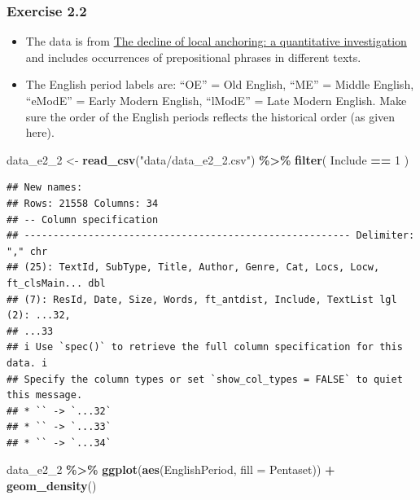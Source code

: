 \documentclass[
]{article}
\newenvironment{Shaded}{\begin{snugshade}}{\end{snugshade}}
\newcommand{\AttributeTok}[1]{\textcolor[rgb]{0.13,0.29,0.53}{#1}}
\newcommand{\DecValTok}[1]{\textcolor[rgb]{0.00,0.00,0.81}{#1}}
\newcommand{\FunctionTok}[1]{\textcolor[rgb]{0.13,0.29,0.53}{\textbf{#1}}}
\newcommand{\NormalTok}[1]{#1}
\newcommand{\OtherTok}[1]{\textcolor[rgb]{0.56,0.35,0.01}{#1}}
\newcommand{\SpecialCharTok}[1]{\textcolor[rgb]{0.81,0.36,0.00}{\textbf{#1}}}
\newcommand{\StringTok}[1]{\textcolor[rgb]{0.31,0.60,0.02}{#1}}
\providecommand{\tightlist}{%
  \setlength{\itemsep}{0pt}\setlength{\parskip}{0pt}}
\begin{document}
\subsubsection{Exercise 2.2}\label{exercise-2.2}

\begin{itemize}
\tightlist
\item
  The data is from \href{https://doi.org/10.1017/S1360674323000047}{The
  decline of local anchoring: a quantitative investigation} and includes
  occurrences of prepositional phrases in different texts.
\item
  The English period labels are: ``OE'' = Old English, ``ME'' = Middle
  English, ``eModE'' = Early Modern English, ``lModE'' = Late Modern
  English. Make sure the order of the English periods reflects the
  historical order (as given here).
\end{itemize}

\begin{Shaded}
\begin{Highlighting}[]
\NormalTok{data\_e2\_2 }\OtherTok{\textless{}{-}} \FunctionTok{read\_csv}\NormalTok{(}\StringTok{"data/data\_e2\_2.csv"}\NormalTok{) }\SpecialCharTok{\%\textgreater{}\%}
  \FunctionTok{filter}\NormalTok{(}
\NormalTok{    Include }\SpecialCharTok{==} \DecValTok{1}
\NormalTok{  )}
\end{Highlighting}
\end{Shaded}

\begin{verbatim}
## New names:
## Rows: 21558 Columns: 34
## -- Column specification
## -------------------------------------------------------- Delimiter: "," chr
## (25): TextId, SubType, Title, Author, Genre, Cat, Locs, Locw, ft_clsMain... dbl
## (7): ResId, Date, Size, Words, ft_antdist, Include, TextList lgl (2): ...32,
## ...33
## i Use `spec()` to retrieve the full column specification for this data. i
## Specify the column types or set `show_col_types = FALSE` to quiet this message.
## * `` -> `...32`
## * `` -> `...33`
## * `` -> `...34`
\end{verbatim}

\begin{Shaded}
\begin{Highlighting}[]
\NormalTok{data\_e2\_2 }\SpecialCharTok{\%\textgreater{}\%}
  \FunctionTok{ggplot}\NormalTok{(}\FunctionTok{aes}\NormalTok{(EnglishPeriod, }\AttributeTok{fill =}\NormalTok{ Pentaset)) }\SpecialCharTok{+}
  \FunctionTok{geom\_density}\NormalTok{()}
\end{Highlighting}
\end{Shaded}
\end{document}
